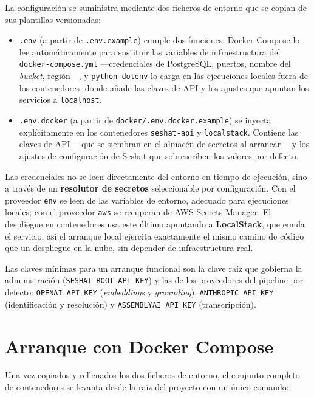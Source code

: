 La configuración se suministra mediante dos ficheros de entorno que se copian de sus plantillas
versionadas:

\begin{itemize}
  \item \texttt{.env} (a partir de \texttt{.env.example}) cumple dos funciones: Docker Compose lo
        lee automáticamente para sustituir las variables de infraestructura del
        \texttt{docker-compose.yml} —credenciales de PostgreSQL, puertos, nombre del \textit{bucket},
        región—, y \texttt{python-dotenv} lo carga en las ejecuciones locales fuera de los
        contenedores, donde añade las claves de \acs{API} y los ajustes que apuntan los servicios a
        \texttt{localhost}.
  \item \texttt{.env.docker} (a partir de \texttt{docker/.env.docker.example}) se inyecta
        explícitamente en los contenedores \texttt{seshat-api} y \texttt{localstack}. Contiene las
        claves de \ac{API} —que se siembran en el almacén de secretos al arrancar— y los ajustes de
        configuración de Seshat que sobrescriben los valores por defecto.
\end{itemize}

Las credenciales no se leen directamente del entorno en tiempo de ejecución, sino a través de un
\textbf{resolutor de secretos} seleccionable por configuración. Con el proveedor \texttt{env} se
leen de las variables de entorno, adecuado para ejecuciones locales; con el proveedor \texttt{aws}
se recuperan de AWS Secrets Manager. El despliegue en contenedores usa este último apuntando a
\textbf{LocalStack}, que emula el servicio: así el arranque local ejercita exactamente el mismo
camino de código que un despliegue en la nube, sin depender de infraestructura real.

Las claves mínimas para un arranque funcional son la clave raíz que gobierna la administración
(\texttt{SESHAT\_ROOT\_API\_KEY}) y las de los proveedores del pipeline por defecto:
\texttt{OPENAI\_API\_KEY} (\textit{embeddings} y \textit{grounding}), \texttt{ANTHROPIC\_API\_KEY}
(identificación y resolución) y \texttt{ASSEMBLYAI\_API\_KEY} (transcripción).

\section{Arranque con Docker Compose}
\label{anx:despliegue-arranque}

Una vez copiados y rellenados los dos ficheros de entorno, el conjunto completo de contenedores se
levanta desde la raíz del proyecto con un único comando:

